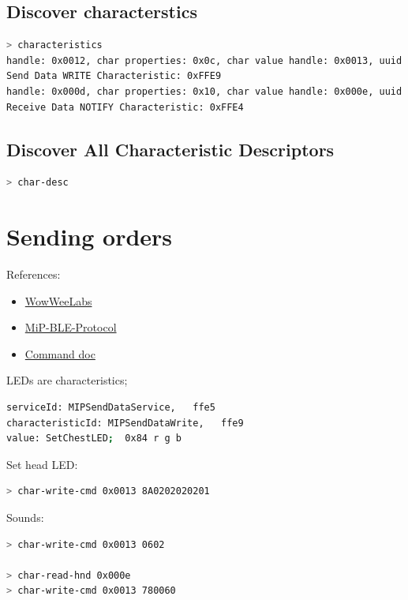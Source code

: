 \documentclass[a4paper,10pt]{article}
\begin{document}
\subsection{Discover characterstics}
\begin{lstlisting}[language=bash]
> characteristics
handle: 0x0012, char properties: 0x0c, char value handle: 0x0013, uuid: 0000ffe9-0000-1000-8000-00805f9b34fb
Send Data WRITE Characteristic: 0xFFE9
handle: 0x000d, char properties: 0x10, char value handle: 0x000e, uuid: 0000ffe4-0000-1000-8000-00805f9b34fb
Receive Data NOTIFY Characteristic: 0xFFE4
\end{lstlisting}

\subsection{Discover All Characteristic Descriptors}
\begin{lstlisting}[language=bash]
> char-desc
\end{lstlisting}

\section{Sending orders}
References:\begin{itemize}
 \item \href{https://github.com/WowWeeLabs}{WowWeeLabs}
 \item \href{https://github.com/WowWeeLabs/MiP-BLE-Protocol}{MiP-BLE-Protocol}
 \item \href{https://github.com/WowWeeLabs/MiP-BLE-Protocol/blob/master/MiP-Protocol.md}
     {Command doc}
\end{itemize}


LEDs are characteristics;
\begin{lstlisting}[language=bash]
serviceId: MIPSendDataService,   ffe5
characteristicId: MIPSendDataWrite,   ffe9
value: SetChestLED;  0x84 r g b
\end{lstlisting}

Set head LED:
\begin{lstlisting}[language=bash]
> char-write-cmd 0x0013 8A0202020201
\end{lstlisting}

Sounds:
\begin{lstlisting}[language=bash]
> char-write-cmd 0x0013 0602

> char-read-hnd 0x000e
> char-write-cmd 0x0013 780060
\end{lstlisting}
\end{document}
